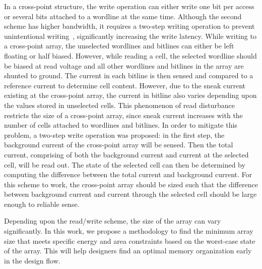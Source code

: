In a cross-point structure, the write operation can either write one bit per access or several bits attached to a wordline at the same time. Although the second scheme has higher bandwidth, it requires a two-step writing operation to prevent unintentional writing~\cite{memristor:Cong}, significantly increasing the write latency. %
While writing to a cross-point array, the unselected wordlines and bitlines can either be left floating or half biased. However, while reading a cell, the selected wordline should be biased at read voltage and all other wordlines and bitlines in the array are shunted to ground. The current in each bitline is then sensed and compared to a reference current to determine cell content. However, due to the sneak current existing at the cross-point array, the current in bitline also varies depending upon the values stored in unselected cells. %
 This phenomenon of read disturbance restricts the size of a cross-point array, since sneak current increases with the number of cells attached to wordlines and bitlines. In order to mitigate this problem, a two-step write operation was proposed: in the first step, the background current of the cross-point array  will be sensed. Then the total current, comprising of both the background current and current at the selected cell, will be read out. The state of the selected cell can then be determined by computing the difference between the total current and background current. For this scheme to work, the cross-point array should be sized such that the difference between background current
 and current through the selected cell should be large enough to reliable sense.

Depending upon the read/write scheme, the size of the array can vary significantly. In this work, we propose a methodology to find the minimum array size that meets specific energy and area constraints based on the worst-case state of the array. This will help designers find an optimal memory organization early in the design flow. %


